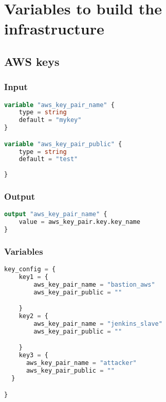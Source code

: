 \section{
{Variables to build the infrastructure}}
\label{sec:Variabelen, inputs, outputs, data sources en locals voor het bouwen van de infrastructuur}

\subsection{
{AWS keys}}
\label{sec:AWS keys}

\subsubsection{
{Input}}

\begin{lstlisting}[language=terraform]
  variable "aws_key_pair_name" {
    type = string
    default = "mykey"
}

variable "aws_key_pair_public" {
    type = string
    default = "test"
  
}  
\end{lstlisting}

\subsubsection{
{Output}}

\begin{lstlisting}[language=terraform]
  output "aws_key_pair_name" {
    value = aws_key_pair.key.key_name
}   
\end{lstlisting}

\subsubsection{
{Variables}}

\begin{lstlisting}[language=terraform]
  key_config = {
    key1 = {
        aws_key_pair_name = "bastion_aws"
        aws_key_pair_public = ""

    }
    key2 = {
        aws_key_pair_name = "jenkins_slave"
        aws_key_pair_public = ""

    }
    key3 = {
      aws_key_pair_name = "attacker"
      aws_key_pair_public = ""
  }

}
\end{lstlisting}

